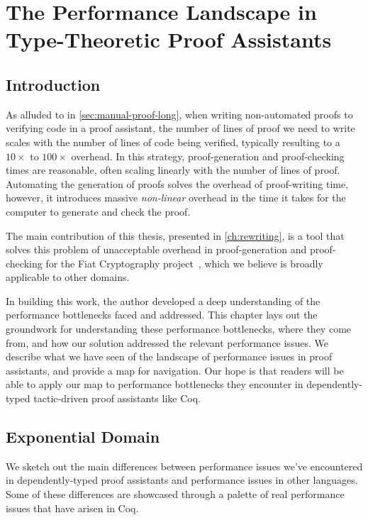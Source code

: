 \chapter{The Performance Landscape in Type-Theoretic Proof Assistants} \label{ch:perf-failures}

\section{Introduction}\label{sec:perf-failures:story}

As alluded to in \autoref{sec:manual-proof-long}, when writing non-automated proofs to verifying code in a proof assistant, the number of lines of proof we need to write scales with the number of lines of code being verified, typically resulting to a $10\times$ to $100\times$ overhead.
In this strategy, proof-generation and proof-checking times are reasonable, often scaling linearly with the number of lines of proof.
Automating the generation of proofs solves the overhead of proof-writing time, however, it introduces massive \emph{non-linear} overhead in the time it takes for the computer to generate and check the proof.

The main contribution of this thesis, presented in \autoref{ch:rewriting}, is a tool that solves this problem of unacceptable overhead in proof-generation and proof-checking for the Fiat Cryptography project~\cite{FiatCryptoSP19},  which we believe is broadly applicable to other domains.

In building this work, the author developed a deep understanding of the performance bottlenecks faced and addressed.
This chapter lays out the groundwork for understanding these performance bottlenecks, where they come from, and how our solution addressed the relevant performance issues.
We describe what we have seen of the landscape of performance issues in proof assistants, and provide a map for navigation.
Our hope is that readers will be able to apply our map to performance bottlenecks they encounter in dependently-typed tactic-driven proof assistants like Coq.

\section{Exponential Domain}\label{sec:perf-failures:exponential-domain}\label{sec:fiat-crypto-codegen-numbers}

We sketch out the main differences between performance issues we've encountered in dependently-typed proof assistants and performance issues in other languages.
Some of these differences are showcased through a palette of real performance issues that have arisen in Coq.

